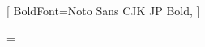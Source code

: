 \setfontface{}[
	BoldFont={Noto Sans CJK JP Bold},
]
\chardef{}

\makeatletter
\ifx\e@alloc@intercharclass@top\@undefined
	\chardef{}
\else
	\chardef\CharBound=\e@alloc@intercharclass@top
\fi
\makeatother


